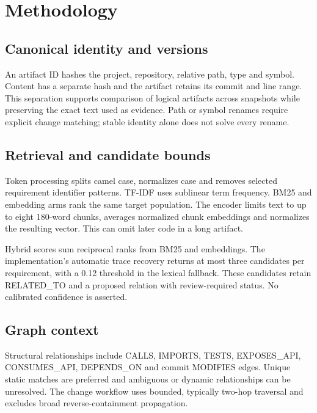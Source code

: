 \documentclass[
  11pt,
  a4paper,
]{report}
\begin{document}
\hypertarget{methodology}{%
\chapter{Methodology}\label{methodology}}

\hypertarget{canonical-identity-and-versions}{%
\section{Canonical identity and
versions}\label{canonical-identity-and-versions}}

An artifact ID hashes the project, repository, relative path, type and
symbol. Content has a separate hash and the artifact retains its commit
and line range. This separation supports comparison of logical artifacts
across snapshots while preserving the exact text used as evidence. Path
or symbol renames require explicit change matching; stable identity
alone does not solve every rename.

\hypertarget{retrieval-and-candidate-bounds}{%
\section{Retrieval and candidate
bounds}\label{retrieval-and-candidate-bounds}}

Token processing splits camel case, normalizes case and removes selected
requirement identifier patterns. TF-IDF uses sublinear term frequency.
BM25 and embedding arms rank the same target population. The encoder
limits text to up to eight 180-word chunks, averages normalized chunk
embeddings and normalizes the resulting vector. This can omit later code
in a long artifact.

Hybrid scores sum reciprocal ranks from BM25 and embeddings. The
implementation's automatic trace recovery returns at most three
candidates per requirement, with a 0.12 threshold in the lexical
fallback. These candidates retain RELATED\_TO and a proposed relation
with review-required status. No calibrated confidence is asserted.

\hypertarget{graph-context}{%
\section{Graph context}\label{graph-context}}

Structural relationships include CALLS, IMPORTS, TESTS, EXPOSES\_API,
CONSUMES\_API, DEPENDS\_ON and commit MODIFIES edges. Unique static
matches are preferred and ambiguous or dynamic relationships can be
unresolved. The change workflow uses bounded, typically two-hop
traversal and excludes broad reverse-containment propagation.
\end{document}
